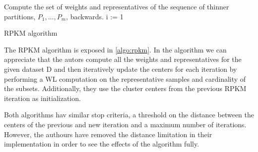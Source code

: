 \begin{algorithm}[H]
    \SetAlgoLined
    Compute the set of weights and representatives of the sequence of thinner partitions, $P_1, \dots ,P_m$, backwards. \;
    i := 1\;
    \label{algo:rpkm}
    \caption{RPKM algorithm}
\end{algorithm}

The RPKM algorithm is exposed in \ref{algo:rpkm}. In the algorithm we can appreciate that the autors compute all the weights and representatives for the given dataset D and then iteratively update the centers for each iteration by performing a WL computation on the representative samples and cardinality of the subsets. Additionally, they use the cluster centers from the previous RPKM iteration as initialization.

Both algorithms hav similar stop criteria, a threshold on the distance between the centers of the previous and new iteration and a maximum number of iterations. However, the authours have removed the distance limitation in their implementation in order to see the effects of the algorithm fully.
